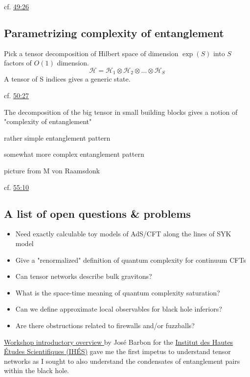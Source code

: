 \documentclass[10pt]{amsart}
\begin{document}
\begin{multicols*}{2}
cf. \href{https://youtu.be/nsxgAOAEgbg?t=49m26s}{49:26}  

\subsection*{Parametrizing complexity of entanglement}

Pick a tensor decomposition of Hilbert space of dimension $\exp{(S)}$ into $S$ factors of $O(1)$ dimension.  
\[
\mathcal{H} = \mathcal{H}_1 \otimes \mathcal{H}_2 \otimes \dots \otimes \mathcal{H}_S
\]
A tensor of S indices gives a generic state.  

cf. \href{https://youtu.be/nsxgAOAEgbg?t=50m27s}{50:27}  

The decomposition of the big tensor in small building blocks gives a notion of "complexity of entanglement"  

rather simple entanglement pattern  

somewhat more complex entanglement pattern

picture from M von Raamsdonk  

cf. \href{https://youtu.be/nsxgAOAEgbg?t=55m10s}{55:10}

\subsection*{A list of open questions \& problems}

\begin{itemize}
\item Need exactly calculable toy models of AdS/CFT along the lines of SYK model  
\item Give a "renormalized" definition of quantum complexity for continuum CFTs 
\item Can tensor networks describe bulk gravitons?  
\item What is the space-time meaning of quantum complexity saturation?  
\item Can we define approximate local observables for black hole inferiors?  
\item Are there obstructions related to firewalls and/or fuzzballs?   
\end{itemize}

\href{https://youtu.be/nsxgAOAEgbg}{Workshop introductory overview } by Jos\'{e} Barbon for the \href{https://www.youtube.com/channel/UC4R1IsRVKs_qlWKTm9pT82Q}{Institut des Hautes Études Scientifiques (IHÉS)} gave me the first impetus to understand tensor networks as I sought to also understand the condensates of entanglement pairs within the black hole.  


\end{multicols*}
\end{document}
